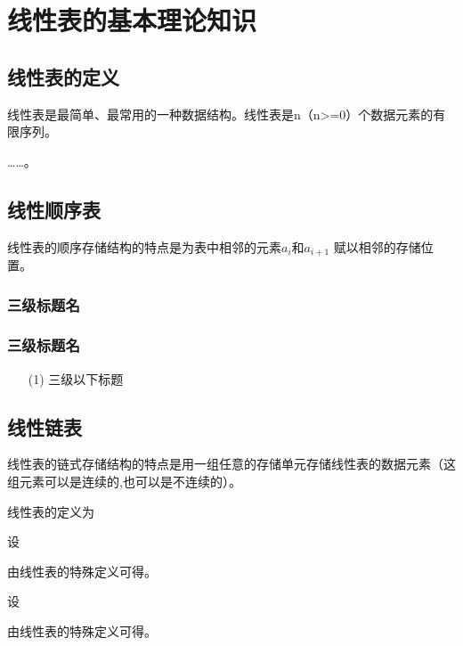 \documentclass[supercite]{upcthesis}
\begin{document}
\section{线性表的基本理论知识}
\subsection{线性表的定义}
线性表是最简单、最常用\cite{Rouse1974Monitoring}的一种数据结构。线性表\cite{贾永红2010数字图像处理}是n（n>=0）个数据元素的有限序列。

……。
\subsection{线性顺序表}
线性表的顺序存储结构的特点是为表中相邻的元素$a_i$和$a_{i+1}$ 赋以相邻的存储位置。
\subsubsection{三级标题名}
\subsubsection{三级标题名}
\begin{itemize}
	\item [(1)] 三级以下标题
\end{itemize}




\subsection{线性链表}

线性表的链式存储结构的特点是用一组任意的存储单元存储线性表的数据元素（这组元素可以是连续的,也可以是不连续的）。


\begin{mdef}
线性表的定义为
\end{mdef}


\begin{mthe}
  设
  
\begin{mpro}
由线性表的特殊定义可得。
\end{mpro}
\end{mthe}

\begin{mlma}
  设
  
\begin{mpro}
由线性表的特殊定义可得。
\end{mpro}
\end{mlma}
\end{document}
